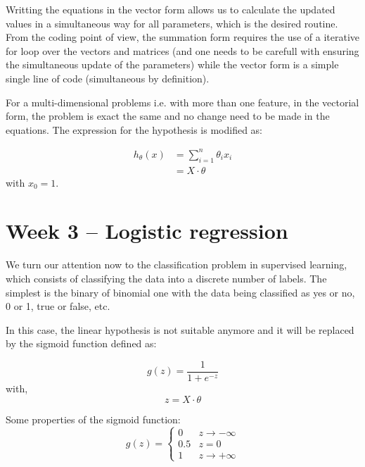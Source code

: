\documentclass[
10pt, %
a4paper, %
oneside, %
headinclude,footinclude, %
BCOR5mm, %
]{scrartcl}
\begin{document}
Writting the equations in the vector form allows us to calculate the updated values in a simultaneous way for all parameters,
which is the desired routine. From the coding point of view, the summation form requires the use of a iterative for loop over the 
vectors and matrices (and one needs to be carefull with ensuring the simultaneous update of the parameters) while the vector form is a simple single line of code (simultaneous by definition).

For a multi-dimensional problems i.e. with more than one feature, in the vectorial form, the problem is exact the same and no change need 
to be made in the equations. The expression for the hypothesis is modified as:

\begin{equation}
    \begin{split}
        h_{\theta}(x) & = \sum_{i=1}^{n} \theta_{i} x_{i} \\
                        & = X \cdot \theta
    \end{split}
\end{equation}
with $x_{0} = 1$.

\section{Week 3 -- Logistic regression}

We turn our attention now to the classification problem in supervised learning, which consists of classifying 
the data into a discrete number of labels. The simplest is the binary of binomial one with the data being classified as
yes or no, 0 or 1, true or false, etc. 

In this case, the linear hypothesis is not suitable anymore and it will be replaced by the sigmoid function defined as:

\begin{equation}
    g(z) = \frac{1}{1 + e^{-z}}
\end{equation}
with,
\begin{equation}
    z = X \cdot \theta
\end{equation}

Some properties of the sigmoid function:
\begin{equation}
    g(z) = 
        \begin{cases}
            0 &  z \rightarrow -\infty \\
            0.5 & z = 0 \\
            1 & z \rightarrow +\infty
        \end{cases}
\end{equation}
\end{document}
